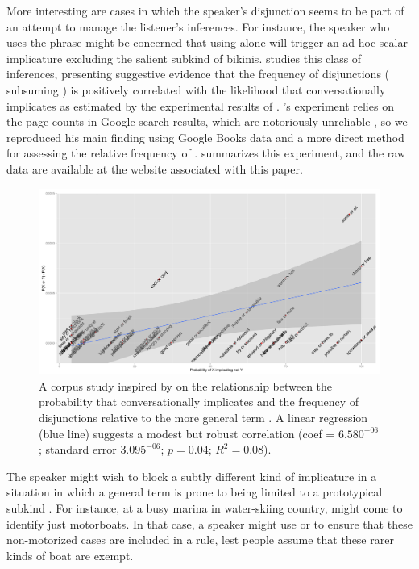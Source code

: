 \documentclass{article}
\begin{document}
More interesting are cases in which the speaker's disjunction seems to
be part of an attempt to manage the listener's inferences. For
instance, the speaker who uses the phrase 
might be concerned that using  alone will trigger an
ad-hoc scalar implicature \citep{Hirschberg85} excluding the salient
subkind of bikinis. \citet{Chemla-HurfordCounts} studies this class of
inferences, presenting suggestive evidence that the frequency of
disjunctions  ( subsuming ) is positively
correlated with the likelihood that  conversationally
implicates  as estimated by the experimental results of
\citet{vanTiel-etal:2013}.  \citeauthor{Chemla-HurfordCounts}'s
experiment relies on the page counts in Google search results, which
are notoriously unreliable \citep{Liberman:2005}, so we reproduced his
main finding using Google Books data \citep{Michel-etal:2011} and a
more direct method for assessing the relative frequency of .  summarizes this experiment, and the raw data
are available at the website associated with this paper.

\begin{figure}[tp]
  \centering
  \includegraphics[width=1\textwidth]{fig/chemla}
  \caption{A corpus study inspired by \citet{Chemla-HurfordCounts} on
    the relationship between the probability that 
    conversationally implicates  and the 
    frequency of disjunctions  relative to 
    the more general term . A linear regression (blue line)
    suggests a modest but robust correlation (coef = $6.580^{-06}$; 
    standard error $3.095^{-06}$; $p = 0.04$; $R^{2} = 0.08$).}
  \label{fig:chemla}
\end{figure}

The speaker might wish to block a subtly different kind of implicature
in a situation in which a general term is prone to being limited to a
prototypical subkind \citep{Levinson00}. For instance, at a busy
marina in water-skiing country,  might come to identify
just motorboats. In that case, a speaker might use  or  to ensure that these non-motorized
cases are included in a rule, lest people assume that these rarer
kinds of boat are exempt.
\end{document}
